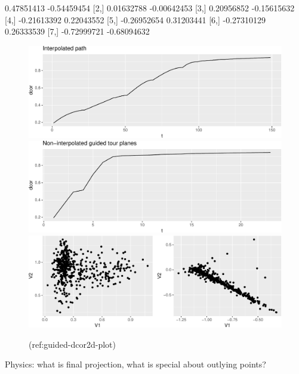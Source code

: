 \documentclass[article]{jss}
\begin{document}
\begin{CodeChunk}

\begin{CodeOutput}
            [,1]        [,2]
[1,]  0.47851413 -0.54459454
[2,]  0.01632788 -0.00642453
[3,]  0.20956852 -0.15615632
[4,] -0.21613392  0.22043552
[5,] -0.26952654  0.31203441
[6,] -0.27310129  0.26333539
[7,] -0.72999721 -0.68094632
\end{CodeOutput}
\begin{figure}

{\centering \includegraphics[width=\textwidth]{figure/guided-dcor2d-plot-1} \includegraphics[width=\textwidth]{figure/guided-dcor2d-plot-2} \includegraphics[width=\textwidth]{figure/guided-dcor2d-plot-3} 

}

\caption[(ref:guided-dcor2d-plot)]{(ref:guided-dcor2d-plot)}\label{fig:guided-dcor2d-plot}
\end{figure}
\end{CodeChunk}

Physics: what is final projection, what is special about outlying
points?
\end{document}
